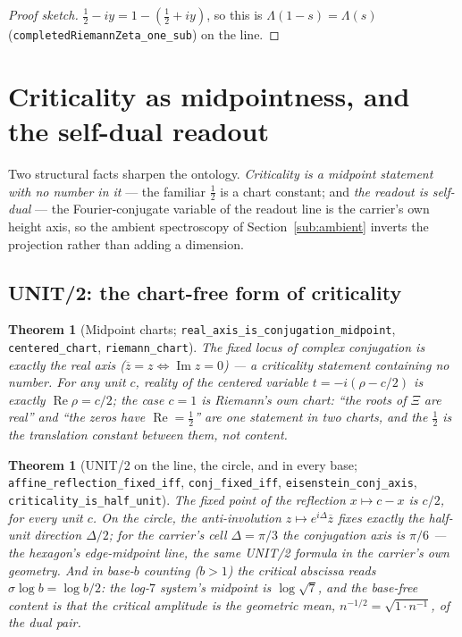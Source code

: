 \documentclass[11pt]{article}
\newtheorem{theorem}[definition]{Theorem}
\DeclareMathOperator{\Ree}{Re}
\DeclareMathOperator{\Imm}{Im}
\newcommand{\conj}[1]{\overline{#1}}
\newcommand{\code}[1]{\texttt{#1}}
\begin{document}
\begin{proof}[Proof sketch]
$\tfrac12-iy=1-(\tfrac12+iy)$, so this is $\Lambda(1-s)=\Lambda(s)$
(\code{completedRiemannZeta\_one\_sub}) on the line.
\end{proof}

\section{Criticality as midpointness, and the self-dual readout}\label{sec:midpoint}

Two structural facts sharpen the ontology.  \emph{Criticality is a midpoint statement with no
number in it} --- the familiar $\tfrac12$ is a chart constant; and \emph{the readout is self-dual}
--- the Fourier-conjugate variable of the readout line is the carrier's own height axis, so the
ambient spectroscopy of Section~\ref{sub:ambient} inverts the projection rather than adding a
dimension.

\subsection{UNIT/2: the chart-free form of criticality}

\begin{theorem}[Midpoint charts; \code{real\_axis\_is\_conjugation\_midpoint}, \code{centered\_chart}, \code{riemann\_chart}]\label{thm:charts}
The fixed locus of complex conjugation is exactly the real axis ($\conj z=z\iff\Imm z=0$) --- a
criticality statement containing no number.  For any unit $c$, reality of the centered variable
$t=-i(\rho-c/2)$ is exactly $\Ree\rho=c/2$; the case $c=1$ is Riemann's own chart: \emph{``the
roots of $\Xi$ are real'' and ``the zeros have $\Ree=\tfrac12$'' are one statement in two charts},
and the $\tfrac12$ is the translation constant between them, not content.
\end{theorem}

\begin{theorem}[UNIT/2 on the line, the circle, and in every base; \code{affine\_reflection\_fixed\_iff}, \code{conj\_fixed\_iff}, \code{eisenstein\_conj\_axis}, \code{criticality\_is\_half\_unit}]\label{thm:unithalf}
The fixed point of the reflection $x\mapsto c-x$ is $c/2$, for every unit $c$.  On the circle, the
anti-involution $z\mapsto e^{i\Delta}\conj z$ fixes exactly the half-unit direction $\Delta/2$; for
the carrier's cell $\Delta=\pi/3$ the conjugation axis is $\pi/6$ --- the hexagon's edge-midpoint
line, the same UNIT/2 formula in the carrier's own geometry.  And in base-$b$ counting
($b>1$) the critical abscissa reads $\sigma\log b=\log b/2$: the log-$7$ system's midpoint is
$\log\sqrt7$, and the base-free content is that the critical amplitude is the geometric mean,
$n^{-1/2}=\sqrt{1\cdot n^{-1}}$, of the dual pair.
\end{theorem}
\end{document}
